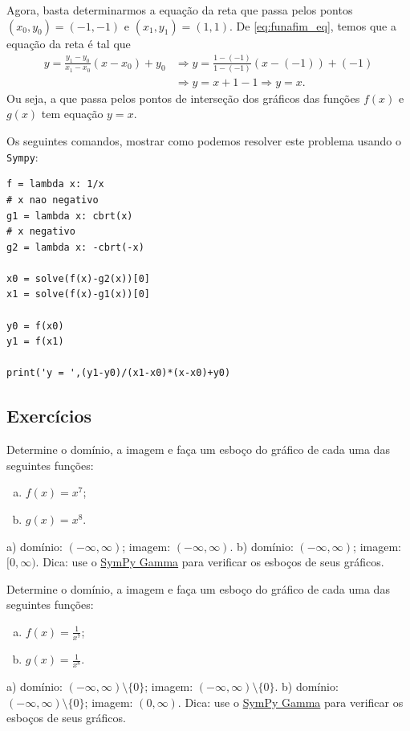 \begin{resol}
  Agora, basta determinarmos a equação da reta que passa pelos pontos $(x_0, y_0) = (-1, -1)$ e $(x_1, y_1) = (1, 1)$. De \eqref{eq:funafim_eq}, temos que a equação da reta é tal que
  \begin{align}
    y = \frac{y_1-y_0}{x_1-x_0}(x-x_0)+y_0 &\Rightarrow y = \frac{1-(-1)}{1-(-1)}(x-(-1))+(-1)\\
                                           &\Rightarrow y = x+1-1 \Rightarrow y = x.
  \end{align}
  Ou seja, a que passa pelos pontos de interseção dos gráficos das funções $f(x)$ e $g(x)$ tem equação $y = x$.

  \ifispython
  Os seguintes comandos, mostrar como podemos resolver este problema usando o \verb+Sympy+:
\begin{verbatim}
f = lambda x: 1/x
# x nao negativo
g1 = lambda x: cbrt(x)
# x negativo
g2 = lambda x: -cbrt(-x)

x0 = solve(f(x)-g2(x))[0]
x1 = solve(f(x)-g1(x))[0]

y0 = f(x0)
y1 = f(x1)

print('y = ',(y1-y0)/(x1-x0)*(x-x0)+y0)
\end{verbatim}
  \fi
\end{resol}

\subsection*{Exercícios}

\begin{exer}
  Determine o domínio, a imagem e faça um esboço do gráfico de cada uma das seguintes funções:
  \begin{enumerate}[a)]
  \item $f(x) = x^7$;
  \item $g(x) = x^8$.
  \end{enumerate}
\end{exer}
\begin{resp}
  a) domínio: $(-\infty, \infty)$; imagem: $(-\infty, \infty)$. b) domínio: $(-\infty, \infty)$; imagem: $[0, \infty)$. Dica: use o \href{https://www.sympygamma.com/}{SymPy Gamma} para verificar os esboços de seus gráficos.
\end{resp}

\begin{exer}
  Determine o domínio, a imagem e faça um esboço do gráfico de cada uma das seguintes funções:
  \begin{enumerate}[a)]
  \item $\displaystyle f(x) = \frac{1}{x^7}$;
  \item $\displaystyle g(x) = \frac{1}{x^8}$.
  \end{enumerate}
\end{exer}
\begin{resp}
  a) domínio: $(-\infty, \infty)\setminus\{0\}$; imagem: $(-\infty, \infty)\setminus\{0\}$. b) domínio: $(-\infty, \infty)\setminus\{0\}$; imagem: $(0, \infty)$. Dica: use o \href{https://www.sympygamma.com/}{SymPy Gamma} para verificar os esboços de seus gráficos.
\end{resp}

